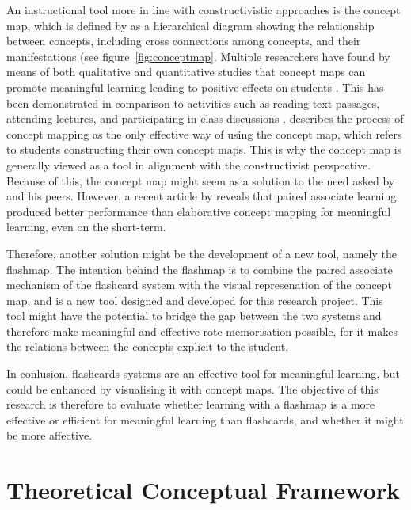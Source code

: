 An instructional tool more in line with constructivistic approaches is the concept map, which is defined by  as a hierarchical diagram showing the relationship between concepts, including cross connections among concepts, and their manifestations (see figure~\ref{fig:conceptmap}. Multiple researchers have found by means of both qualitative and quantitative studies that concept maps can promote meaningful learning leading to positive effects on students \cite{hwang2, subramaniam, canas}. This has been demonstrated in comparison to activities such as reading text passages, attending lectures, and participating in class discussions \cite{singh, nesbit2}.  describes the process of concept mapping as the only effective way of using the concept map, which refers to students constructing their own concept maps. This is why the concept map is generally viewed as a tool in alignment with the constructivist perspective. Because of this, the concept map might seem as a solution to the need asked by  and his peers. However, a recent article by  reveals that paired associate learning produced better performance than elaborative concept mapping for meaningful learning, even on the short-term.


Therefore, another solution might be the development of a new tool, namely the flashmap. The intention behind the flashmap is to combine the paired associate mechanism of the flashcard system with the visual represenation of the concept map, and is a new tool designed and developed for this research project. This tool might have the potential to bridge the gap between the two systems and therefore make meaningful and effective rote memorisation possible, for it makes the relations between the concepts explicit to the student.


In conlusion, flashcards systems are an effective tool for meaningful learning, but could be enhanced by visualising it with concept maps. The objective of this research is therefore to evaluate whether learning with a flashmap is a more effective or efficient for meaningful learning than flashcards, and whether it might be more affective.

\section{Theoretical Conceptual Framework}

